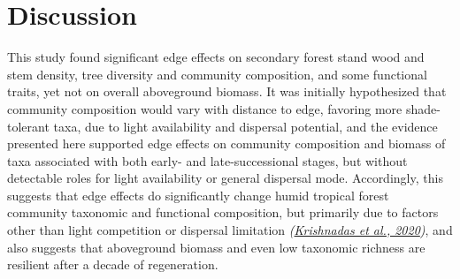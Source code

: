 \documentclass[
  12pt,
]{article}
\begin{document}
\hypertarget{discussion}{%
\section{Discussion}\label{discussion}}

This study found significant edge effects on secondary forest stand wood and stem density, tree diversity and community composition, and some functional traits, yet not on overall aboveground biomass.
It was initially hypothesized that community composition would vary with distance to edge, favoring more shade-tolerant taxa, due to light availability and dispersal potential,
and the evidence presented here supported edge effects on community composition and biomass of taxa associated with both early- and late-successional stages, but without detectable roles for light availability or general dispersal mode.
Accordingly, this suggests that edge effects do significantly change humid tropical forest community taxonomic and functional composition, but primarily due to factors other than light competition or dispersal limitation \emph{(\protect\hyperlink{ref-krishnadas20}{Krishnadas et al., 2020})}, and also suggests that aboveground biomass and even low taxonomic richness are resilient after a decade of regeneration.
\end{document}
